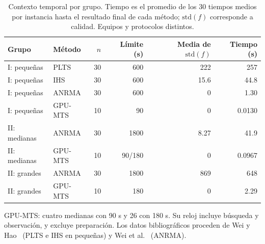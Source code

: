 \begin{table}[tbp]\centering\small
\caption{Contexto temporal por grupo. Tiempo es el promedio de los 30 tiempos medios por instancia hasta el resultado final de cada método; $\mathrm{std}(f)$ corresponde a calidad. Equipos y protocolos distintos.}
\label{tab:literature-timing}
\begin{tabular}{llrrrr}
\toprule
Grupo & Método & $n$ & Límite (s) & Media de $\mathrm{std}(f)$ & Tiempo (s)\\
\midrule
I: pequeñas & PLTS & 30 & 600 & 222 & 257\\
I: pequeñas & IHS & 30 & 600 & 15.6 & 44.8\\
I: pequeñas & ANRMA & 30 & 600 & 0 & 1.30\\
I: pequeñas & GPU-MTS & 10 & 90 & 0 & 0.0130\\
II: medianas & ANRMA & 30 & 1800 & 8.27 & 41.9\\
II: medianas & GPU-MTS & 10 & 90/180 & 0 & 0.0967\\
II: grandes & ANRMA & 30 & 1800 & 869 & 648\\
II: grandes & GPU-MTS & 10 & 180 & 0 & 2.29\\
\bottomrule\end{tabular}
\par\smallskip\parbox{.97\linewidth}{\footnotesize GPU-MTS: cuatro medianas con 90 s y 26 con 180 s. Su reloj incluye búsqueda y observación, y excluye preparación. Los datos bibliográficos proceden de Wei y Hao~\cite{Wei2023IHS} (PLTS e IHS en pequeñas) y Wei et al.~\cite{Wei2026ANRMA} (ANRMA).}
\end{table}
